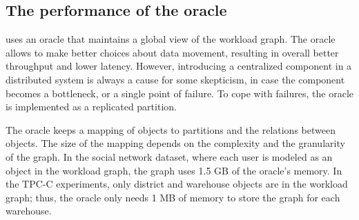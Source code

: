 

\subsection{The performance of the oracle}

\dynastar  uses an oracle that maintains a global view of the workload graph. The oracle allows
\dynastar to make better choices about data movement, resulting in overall
better throughput and lower latency. However, introducing a centralized
component in a distributed system is always a cause for some skepticism,
in case the component becomes a bottleneck, or a single point of failure.
To cope with failures, the oracle is implemented as a replicated partition.

The oracle keeps a mapping of objects to partitions and the relations between objects.
The size of the mapping depends on the complexity and the granularity of the graph.
In the social network dataset, where each user is modeled as an object in the workload graph,
the graph uses 1.5 GB of the oracle's memory.
In the TPC-C experiments, only district and warehouse objects are in the workload graph;
thus, the oracle only needs 1 MB of memory to store the graph for each warehouse.

